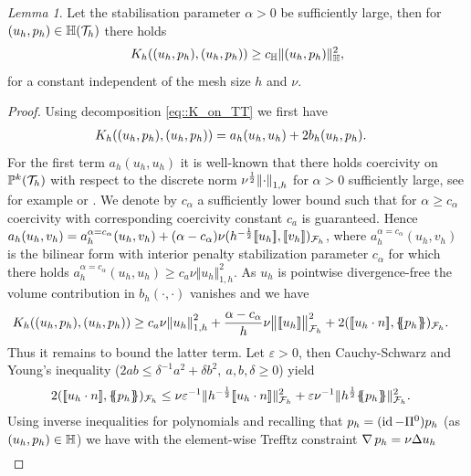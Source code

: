 \documentclass[pdflatex,sn-mathphys,Numbered]{sn-jnl}%
\theoremstyle{remark}%
\newtheorem{lemma}[theorem]{Lemma}
\theoremstyle{definition}%
\begin{document}
\begin{lemma}\label{lem:coercivity} Let the stabilisation parameter
  $\alpha>0$ be sufficiently large, then for $(u_h,p_h) \in \mathbb{H}({\mathcal{T}_h})$ there
  holds
  \begin{equation}
    K_h((u_h,p_h),(u_h,p_h)) \geq c_{\mathbb{H}} \Vert (u_h,p_h) \Vert_{\mathbb{H}}^2,
  \end{equation}
  for a constant independent of the mesh size $h$ and $\nu$.
\end{lemma}
\begin{proof}
Using decomposition \eqref{eq::K_on_TT} we first have
  \begin{align*}
    K_h((u_h,p_h),(u_h,p_h)) & = a_h(u_h,u_h) + 2 b_h(u_h,p_h).
    \end{align*}
    For the first term $a_h(u_h,u_h)$ it is well-known that there holds coercivity on $\mathbb{P}^k({\mathcal{T}_h})$ with respect to the discrete norm $\nu^{\frac12} \norm{\cdot}_{1,h}$ for $\alpha>0$ sufficiently large, see for example \cite{arnold2002unified} or \cite[Lemma 4.12]{di2011mathematical}. We denote by $c_\alpha$ a sufficiently lower bound such that for $\alpha\geq c_\alpha$ coercivity with corresponding coercivity constant $c_a$ is guaranteed.
Hence $a_h(u_h,v_h) = a_h^{\alpha=c_\alpha}(u_h,v_h) + (\alpha - c_\alpha) \nu (h^{-\frac12}[\![u_h]\!],[\![v_h]\!])_{{\mathcal{F}_h}}$, where $a_h^{\alpha=c_\alpha}(u_h,v_h)$ is the bilinear form with interior penalty stabilization parameter $c_\alpha$ for which there holds
$a_h^{\alpha=c_\alpha}(u_h,u_h) \geq c_a \nu \Vert u_h \Vert_{1,h}^2$.
As $u_h$ is pointwise divergence-free the volume contribution in $b_h(\cdot,\cdot)$ vanishes and we have
  \begin{align*}
    \Kh((u_h,p_h),(u_h,p_h)) & \geq c_{a} \nu \norm{u_h}_{1,h}^2 + \frac{\alpha - c_\alpha}{h} \nu \norm{\jmp{u_h}}_{\Fh}^2 + 2 (\jmp{u_h \cdot n}, \avg{p_h})_{\Fh}.
  \end{align*}
  Thus it remains to bound the latter term. Let $\varepsilon > 0$, then Cauchy-Schwarz
  and Young's inequality ($2 a b \leq \delta^{-1} a^2 + \delta
  b^2,~a,b,\delta \geq 0$) yield
  \begin{align*}
    2 (\jmp{u_h \cdot n}, \avg{p_h})_{\Fh} & \leq \nu \varepsilon^{-1} \Vert{h^{-\frac12}\jmp{u_h \cdot n}}\Vert_{\Fh}^2 + \varepsilon \nu^{-1} \nrm{h^{\frac12}\avg{p_h}}_{\Fh}^2.
  \end{align*}
  Using inverse inequalities for polynomials and recalling that $p_h =
  (\operatorname{id}-\Pi^0)p_h$ (as $(u_h,p_h)\in \mathbb{H}$) we have with the
  element-wise Trefftz constraint $\operatorname{\nabla} p_h = \nu \Delta u_h$ 
  \begin{align*}

\end{align*}
\end{proof}
\end{document}
